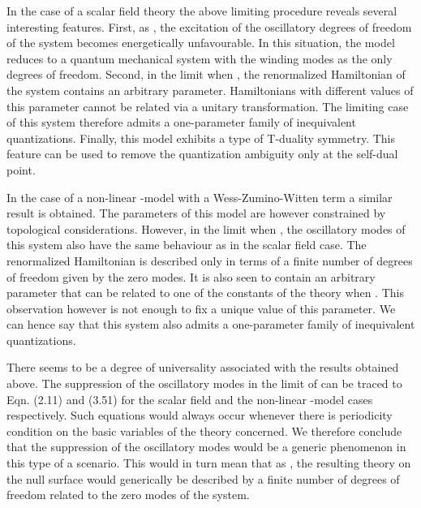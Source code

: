 \documentclass[a4paper,12pt]{article}
\begin{document}
In the case of a scalar field theory the above limiting procedure reveals
several interesting features. First, 
as \coordHE{}, the excitation of the 
oscillatory degrees of freedom of the system becomes energetically
unfavourable. 
In this situation, the model reduces to a
quantum mechanical system with the winding modes as the only degrees of
freedom. Second, in the limit when \coordHE{}, the renormalized
Hamiltonian of the system contains an arbitrary parameter. 
Hamiltonians with different values of this parameter cannot be related via a
unitary transformation.
The limiting case of this system therefore admits a
one-parameter family of inequivalent quantizations. Finally, this model  
exhibits a type of T-duality symmetry. This feature can be used to
remove the quantization ambiguity only at the self-dual point.

In the case of a non-linear \myHighlight{$\sigma$}\coordHE{}-model with a Wess-Zumino-Witten term a
similar result is obtained. The parameters of this model are however
constrained by topological considerations. However, in the limit when 
\coordHE{}, the oscillatory modes of this system also have the same
behaviour as in the scalar field case. The renormalized Hamiltonian is
described only in terms of a finite number of degrees of freedom given by
the zero modes. It is also seen to contain an arbitrary parameter that 
can be related to one of the constants of the theory  when \coordHE{}.
This observation however is not enough to fix a unique
 value of this parameter. We can hence say that this
system also admits a one-parameter family of inequivalent quantizations.

There seems to be a degree of universality associated with the results
obtained above. The suppression of the oscillatory modes in the limit of 
\coordHE{} can be traced to Eqn. (2.11) and (3.51) for the scalar
field and the non-linear \myHighlight{$\sigma$}\coordHE{}-model cases respectively. Such equations
would always occur whenever there is periodicity condition on the basic
variables of the theory concerned. We therefore conclude that the
suppression of the oscillatory modes would be a generic phenomenon in this
type of a scenario. This would in turn mean that as \coordHE{},
the resulting theory on the null surface would generically be described by a
finite number of degrees of freedom related to the zero modes of the system.
\end{document}
